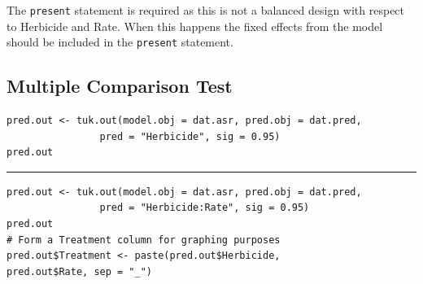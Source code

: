 \documentclass[a4paper, 10pt, fleqn, twosided]{memoir}
\begin{document}
The \texttt{present} statement is required as this is not a balanced design with respect to Herbicide and Rate. When
this happens the fixed effects from the model should be included in the \texttt{present} statement.

\subsection{Multiple Comparison Test}

\begin{tcolorbox}[title = Example 7 Tukey's multiple comparison]
\begin{verbatim}
pred.out <- tuk.out(model.obj = dat.asr, pred.obj = dat.pred,
                pred = "Herbicide", sig = 0.95)
pred.out
\end{verbatim}
{\color{code} {\hrule height 1pt}}
\begin{verbatim}
pred.out <- tuk.out(model.obj = dat.asr, pred.obj = dat.pred,
                pred = "Herbicide:Rate", sig = 0.95)
pred.out
# Form a Treatment column for graphing purposes
pred.out$Treatment <- paste(pred.out$Herbicide,
pred.out$Rate, sep = "_")
\end{verbatim}
\end{tcolorbox}
\clearpage
\end{document}
